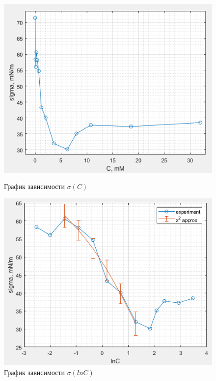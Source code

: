 \documentclass[a4paper, 12pt]{article}
\begin{document}
\begin{figure}[h!]
\begin{center}
\begin{minipage}[h]{0.45\linewidth}
\includegraphics[width=1\textwidth]{1 sigma(C).png}
\caption{График зависимости $\sigma(C)$} %
\label{ris:experimoriginal} %
\end{minipage}
\hfill 
\begin{minipage}[h]{0.5\linewidth}
\includegraphics[width=1\textwidth]{2 sigma(lnC)+x2.png}
\caption{График зависимости $\sigma(lnC)$}
\label{ris:experimcoded}
\end{minipage}
\end{center}
\end{figure}
\end{document}
